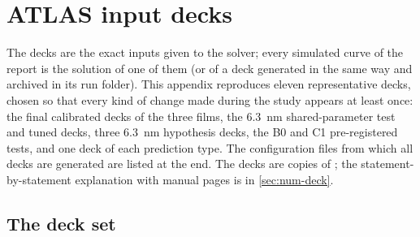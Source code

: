 \chapter{ATLAS input decks}\label{ch:app-decks}

The decks are the exact inputs given to the solver; every simulated curve of the report is the solution of one of them
(or of a deck generated in the same way and archived in its run folder). This appendix reproduces eleven representative
decks, chosen so that every kind of change made during the study appears at least once: the final calibrated decks of
the three films, the \SI{6.3}{nm} shared-parameter test and tuned decks, three \SI{6.3}{nm} hypothesis decks, the B0 and C1
pre-registered tests, and one deck of each prediction type. The configuration files from which all decks are generated
are listed at the end. The decks are copies of ; the statement-by-statement
explanation with manual pages is in \cref{sec:num-deck}.

\section{The deck set}\label{sec:decks-set}

